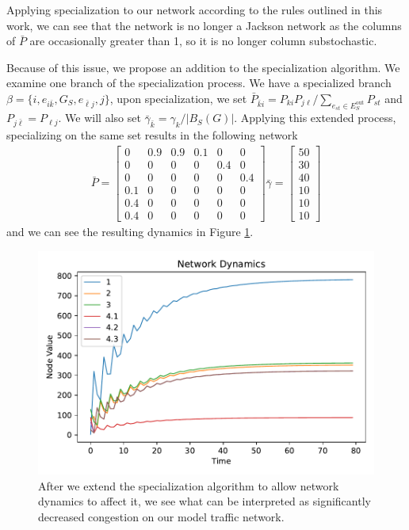 \documentclass[12pt]{thesis}
\begin{document}
Applying specialization to our network according to the rules outlined in this work, we can see that the network is no longer a Jackson network as the columns of $\bar{P}$ are occasionally greater than 1, so it is no longer column substochastic.

Because of this issue, we propose an addition to the specialization algorithm.
We examine one branch of the specialization process. 
We have a specialized branch $\beta = \{i, e_{i\bar{k}}, G_S, e_{\bar{\ell}j}, j \}$, upon specialization, we set $\bar{P}_{\bar{k}i} = P_{ki}P_{j\ell}/\sum_{e_{st}\in E_{S}^{{\text{out}}}}P_{st}$ and $P_{j\bar{\ell}} = P_{\ell j}$.
We will also set $\bar{\gamma}_{\bar{k}} = \gamma_{k}/|B_S(G)|$.
Applying this extended process, specializing on the same set results in the following network
\begin{align*}
    \bar{P} = 
    \begin{bmatrix} 
          0  &  0.9  &  0.9  &  0.1  &    0  &    0 \\
          0  &    0  &    0  &    0  &  0.4  &    0 \\
          0  &    0  &    0  &    0  &    0  &  0.4 \\
        0.1  &    0  &    0  &    0  &    0  &    0 \\
        0.4  &    0  &    0  &    0  &    0  &    0 \\
        0.4  &    0  &    0  &    0  &    0  &    0 
    \end{bmatrix}
    \bar{\gamma} = \begin{bmatrix} 50 \\ 30 \\ 40 \\ 10 \\ 10 \\ 10 \end{bmatrix}
\end{align*}
and we can see the resulting dynamics in Figure \ref{fig:jackson_network_fixed}.

\begin{figure}
    \centering
    \includegraphics[width=.75\textwidth]{images/jackson_network_2_fixed.pdf}
    \caption{
        After we extend the specialization algorithm to allow network dynamics to affect it, we see what can be interpreted as significantly decreased congestion on our model traffic network.
    }
    \label{fig:jackson_network_fixed}
\end{figure}
\end{document}
